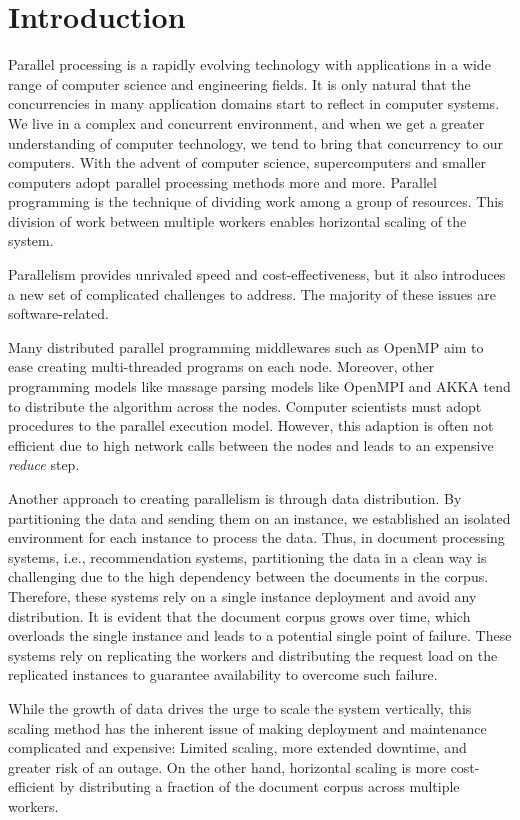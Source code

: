 \chapter{Introduction}

Parallel processing is a rapidly evolving technology with applications in a wide range of computer science and engineering fields. It is only natural that the concurrencies in many application domains start to reflect in computer systems. We live in a complex and concurrent environment, and when we get a greater understanding of computer technology, we tend to bring that concurrency to our computers. With the advent of computer science, supercomputers and smaller computers adopt parallel processing methods more and more. Parallel programming is the technique of dividing work among a group of resources. This division of work between multiple workers enables horizontal scaling of the system. 


Parallelism provides unrivaled speed and cost-effectiveness, but it also introduces a new set of complicated challenges to address. The majority of these issues are software-related. 


Many distributed parallel programming middlewares such as OpenMP aim to ease creating multi-threaded programs on each node. Moreover, other programming models like massage parsing models like OpenMPI and AKKA tend to distribute the algorithm across the nodes. Computer scientists must adopt procedures to the parallel execution model. However, this adaption is often not efficient due to high network calls between the nodes and leads to an expensive \emph{reduce} step.


Another approach to creating parallelism is through data distribution. By partitioning the data and sending them on an instance, we established an isolated environment for each instance to process the data. Thus, in document processing systems, i.e., recommendation systems, partitioning the data in a clean way is challenging due to the high dependency between the documents in the corpus. Therefore, these systems rely on a single instance deployment and avoid any distribution. It is evident that the document corpus grows over time, which overloads the single instance and leads to a potential single point of failure. These systems rely on replicating the workers and distributing the request load on the replicated instances to guarantee availability to overcome such failure.


While the growth of data drives the urge to scale the system vertically, this scaling method has the inherent issue of making deployment and maintenance complicated and expensive: Limited scaling, more extended downtime, and greater risk of an outage. On the other hand, horizontal scaling is more cost-efficient by distributing a fraction of the document corpus across multiple workers.


